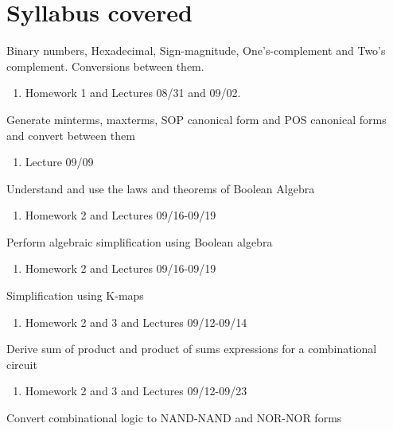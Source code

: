 
\maketitle

\section{Syllabus covered}
\begin{todolist}
  \item[\done] Binary numbers, Hexadecimal, Sign-magnitude, One's-complement and
    Two's complement. Conversions between them.
    \begin{enumerate}
      \item Homework 1 and Lectures 08/31 and 09/02.
    \end{enumerate}
  \item[\done] Generate minterms, maxterms, SOP canonical form and POS
    canonical forms and convert between them\\
  \begin{enumerate}
    \item Lecture 09/09
  \end{enumerate}
  \item[\done]  Understand and use the laws and theorems of Boolean Algebra
  \begin{enumerate}
    \item Homework 2 and Lectures 09/16-09/19
  \end{enumerate}
  \item[\done]  Perform algebraic simplification using Boolean algebra
  \begin{enumerate}
    \item Homework 2 and Lectures 09/16-09/19
  \end{enumerate}
  \item[\done]  Simplification using K-maps
    \begin{enumerate}
    \item Homework 2 and 3 and Lectures 09/12-09/14
    \end{enumerate}
  \item[\done]  Derive sum of product and product of sums expressions for a combinational circuit
    \begin{enumerate}
    \item Homework 2 and 3 and Lectures 09/12-09/23
    \end{enumerate}
  \item[\done]  Convert combinational logic to NAND-NAND and NOR-NOR forms

\end{todolist}
